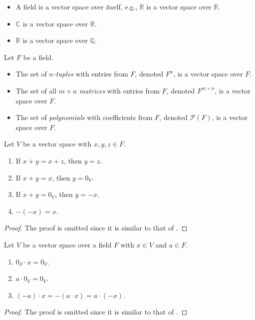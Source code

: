 \begin{examples}
  \leavevmode
  \begin{itemize}
    \item A field is a vector space over itself, e.g., $\mathbb{R}$ is a vector
      space over $\mathbb{R}$.
    \item $\mathbb{C}$ is a vector space over $\mathbb{R}$.
    \item $\mathbb{R}$ is a vector space over $\mathbb{Q}$.
  \end{itemize}
\end{examples}

\begin{examples}
  Let $F$ be a field.
  \begin{itemize}
    \item The set of \emph{$n$-tuples} with entries from $F$, denoted $F^n$,
    is a vector space over $F$.
    \item The set of all $m \times n$ \emph{matrices} with entries from $F$,
    denoted $F^{m \times n}$, is a vector space over $F$.
    \item The set of \emph{polynomials} with coefficients from $F$, denoted
    $\mathcal{P}(F)$, is a vector space over $F$.
  \end{itemize}
\end{examples}

\begin{proposition}\label{prop:vector-space-addition}
  Let $V$ be a vector space with $x, y, z \in F$.
  \begin{enumerate}
    \item If $x + y = x + z$, then $y = z$.
    \item If $x + y = x$, then $y = 0_V$.
    \item If $x + y = 0_V$, then $y = -x$.
    \item $-(-x) = x$.
  \end{enumerate}
\end{proposition}
\begin{proof}
  The proof is omitted since it is similar to that of
  .
\end{proof}

\begin{proposition}\label{prop:vector-space-operation}
  Let $V$ be a vector space over a field $F$ with $x \in V$ and $a \in F$.
  \begin{enumerate}
    \item $0_F \cdot x = 0_V$.
    \item $a \cdot 0_V = 0_V$.
    \item $(-a) \cdot x = -(a \cdot x) = a \cdot (-x)$.
  \end{enumerate}
\end{proposition}
\begin{proof}
  The proof is omitted since it is similar to that of
  .
\end{proof}

